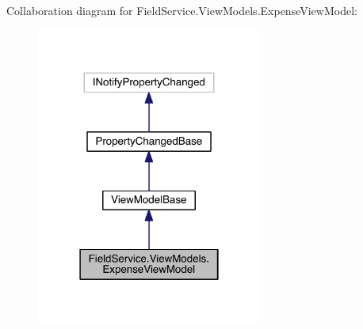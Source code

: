 Collaboration diagram for Field\+Service.\+View\+Models.\+Expense\+View\+Model\+:
\nopagebreak
\begin{figure}[H]
\begin{center}
\leavevmode
\includegraphics[width=210pt]{class_field_service_1_1_view_models_1_1_expense_view_model__coll__graph}
\end{center}
\end{figure}

